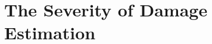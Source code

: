 
\chapter[The Severity of Damage Estimation]{The Severity of Damage Estimation}
\label{ch:severity}






